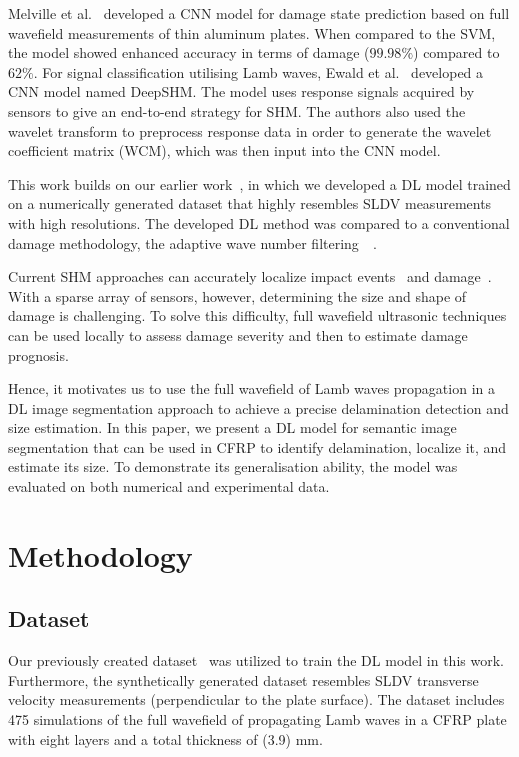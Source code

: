 \documentclass[runningheads]{llncs}
\begin{document}
Melville et al.~\cite{Melville2018} developed a CNN model for damage state prediction based on full wavefield measurements of thin aluminum plates.
When compared to the SVM, the model showed enhanced accuracy in terms of damage (\(99.98\%\)) compared to \(62\%\).
For signal classification utilising Lamb waves, Ewald et al.~\cite{Ewald2019} developed a CNN model named DeepSHM.
The model uses response signals acquired by sensors to give an end-to-end strategy for SHM.
The authors also used the wavelet transform to preprocess response data in order to generate the wavelet coefficient matrix (WCM), which was then input into the CNN model.

This work builds on our earlier work~\cite{Ijjeh2021}, in which we developed a DL model trained on a numerically generated dataset that highly resembles SLDV measurements with high resolutions.
The developed DL method was compared to a conventional damage methodology, the adaptive wave number filtering~\cite{Kudela2015}~\cite{Radzienski2019a}.

Current SHM approaches can accurately localize impact events~\cite{Ciampa2012} and damage~\cite{Nokhbatolfoghahai2020}.
With a sparse array of sensors, however, determining the size and shape of damage is challenging.
To solve this difficulty, full wavefield ultrasonic techniques can be used locally to assess damage severity and then to estimate damage prognosis.

Hence, it motivates us to use the full wavefield of Lamb waves propagation in a DL image segmentation approach to achieve a precise delamination detection and size estimation.
In this paper, we present a DL model for semantic image segmentation that can be used in CFRP to identify delamination, localize it, and estimate its size.
To demonstrate its generalisation ability, the model was evaluated on both numerical and experimental data.
\section{Methodology}
\label{methodology}
\subsection{Dataset}
Our previously created dataset~\cite{Ijjeh2021} was utilized to train the DL model in this work.
Furthermore, the synthetically generated dataset resembles SLDV transverse velocity measurements (perpendicular to the plate surface).
The dataset includes 475 simulations of the full wavefield of propagating Lamb waves in a CFRP plate with eight layers and a total thickness of (3.9) mm.
\end{document}
